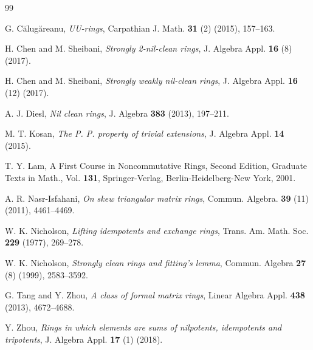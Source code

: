 \documentclass[12pt]{amsart}
\theoremstyle{definition}
\begin{document}
\begin{thebibliography}{99}
	
G. C{\u{a}}lug{\u{a}}reanu, {\it UU-rings}, Carpathian J. Math. {\bf 31} (2) (2015), 157--163.		

H. Chen and M. Sheibani, {\it Strongly 2-nil-clean rings}, J. Algebra Appl. {\bf 16} (8) (2017).

H. Chen and M. Sheibani, {\it Strongly weakly nil-clean rings}, J. Algebra Appl. {\bf 16} (12) (2017).

A. J. Diesl, {\it Nil clean rings}, J. Algebra {\bf 383} (2013), 197--211.

M. T. Kosan, {\it The P. P. property of trivial extensions}, J. Algebra Appl. {\bf 14} (2015).

T. Y. Lam, A First Course in Noncommutative Rings, Second Edition, Graduate Texts in Math., Vol. {\bf 131}, Springer-Verlag, Berlin-Heidelberg-New York, 2001.

A. R. Nasr-Isfahani, {\it On skew triangular matrix rings}, Commun. Algebra. {\bf 39} (11) (2011), 4461--4469.

W. K. Nicholson, {\it Lifting idempotents and exchange rings}, Trans. Am. Math. Soc. {\bf 229} (1977), 269--278.

W. K. Nicholson, {\it Strongly clean rings and fitting's lemma}, Commun. Algebra {\bf 27} (8) (1999), 2583--3592.

G. Tang and Y. Zhou, {\it A class of formal matrix rings}, Linear Algebra Appl. {\bf 438} (2013), 4672--4688.

Y. Zhou, {\it Rings in which elements are sums of nilpotents, idempotents and tripotents}, J. Algebra Appl. {\bf 17} (1) (2018).

\end{thebibliography}
\end{document}
